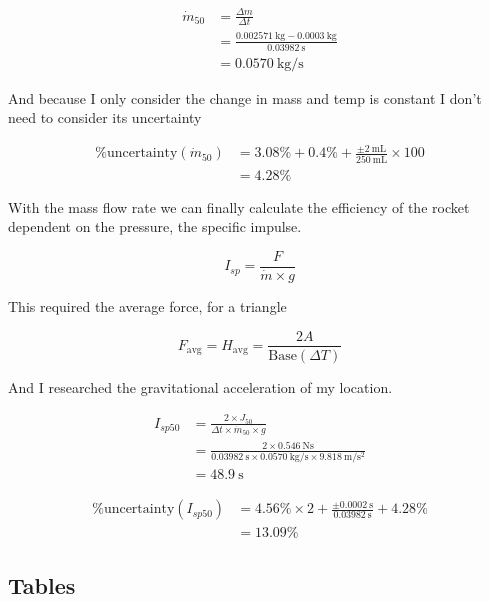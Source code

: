 \documentclass[12pt,a4paper]{article}
\begin{document}
\begin{align}
\dot{m}_{50} &= \frac{\Delta m}{\Delta t} \\
&= \frac{\SI{0.002571}{\kilo\gram} - \SI{0.0003}{\kilo\gram}}{\SI{0.03982}{\second}} \\
&= \SI{0.0570}{\kilo\gram\per\second}
\end{align}

And because I only consider the change in mass and temp is constant I don't need to consider its uncertainty

\begin{align}
\%\text{uncertainty}(\dot{m}_{50}) &= 3.08\% + 0.4\% + \frac{\pm \SI{2}{\milli\liter}}{\SI{250}{\milli\liter}} \times 100 \\
&= 4.28\%
\end{align}

With the mass flow rate we can finally calculate the efficiency of the rocket dependent on the pressure, the specific impulse.

\begin{equation}
I_{sp} = \frac{F}{\dot{m} \times g}
\end{equation}

This required the average force, for a triangle

\begin{equation}
F_{\text{avg}} = H_{\text{avg}} = \frac{2A}{\text{Base}(\Delta T)}
\end{equation}

And I researched the gravitational acceleration of my location\cite{ref15}.

\begin{align}
I_{sp50} &= \frac{2 \times J_{50}}{\Delta t \times \dot{m}_{50} \times g} \\
&= \frac{2 \times \SI{0.546}{\newton\second}}{\SI{0.03982}{\second} \times \SI{0.0570}{\kilo\gram\per\second} \times \SI{9.818}{\meter\per\second\squared}} \\
&= \SI{48.9}{\second}
\end{align}

\begin{align}
\%\text{uncertainty}(I_{sp50}) &= 4.56\% \times 2 + \frac{\pm \SI{0.0002}{\second}}{\SI{0.03982}{\second}} + 4.28\% \\
&= 13.09\%
\end{align}

\subsection{Tables}
\end{document}

